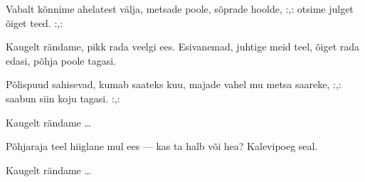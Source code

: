 Vabalt k\~onnime ahelatest v\"alja,
metsade poole, s\~oprade hoolde,
:,: otsime julget \~oiget teed. :,:

Kaugelt r\"andame,
pikk rada veelgi ees.
Esivanemad, juhtige meid teel,
\~oiget rada edasi,
p\~ohja poole tagasi.

P\~olispuud sahisevad, kumab saateks kuu,
majade vahel mu metsa saareke,
:,: saabun siin koju tagasi. :,:

Kaugelt r\"andame \ldots

P\~ohjaraja teel
hiiglane mul ees ---
kas ta halb v\~oi hea?
Kalevipoeg seal.

Kaugelt r\"andame \ldots